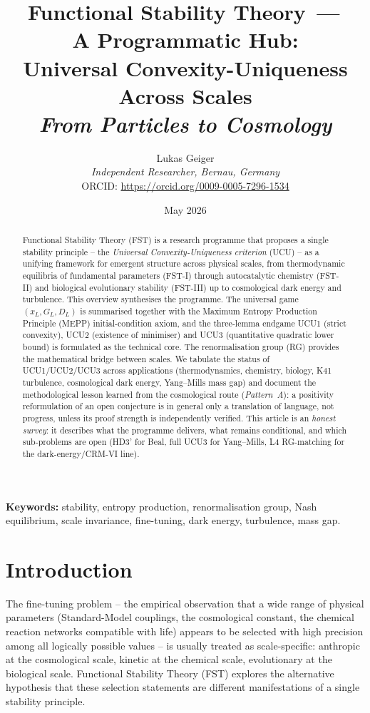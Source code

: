 \documentclass[11pt,a4paper]{article}
\title{Functional Stability Theory \,---\,\\
A Programmatic Hub:\\
Universal Convexity-Uniqueness\\
Across Scales\\[0.5em]
\large\textit{From Particles to Cosmology}}
\author{Lukas Geiger\\
\textit{Independent Researcher, Bernau, Germany}\\
ORCID: \url{https://orcid.org/0009-0005-7296-1534}}
\date{May 2026}
\theoremstyle{remark}
\begin{document}
\maketitle

\begin{abstract}
\noindent
Functional Stability Theory (FST) is a research programme that proposes
a single stability principle -- the \emph{Universal Convexity-Uniqueness
criterion} (UCU) -- as a unifying framework for emergent structure
across physical scales, from thermodynamic equilibria of fundamental
parameters (FST-I) through autocatalytic chemistry (FST-II) and
biological evolutionary stability (FST-III) up to cosmological dark
energy and turbulence. This overview synthesises the programme. The
universal game $(x_L, G_L, D_L)$ is summarised together with the
Maximum Entropy Production Principle (MEPP) initial-condition axiom,
and the three-lemma endgame UCU1 (strict convexity), UCU2 (existence
of minimiser) and UCU3 (quantitative quadratic lower bound) is
formulated as the technical core. The renormalisation group (RG)
provides the mathematical bridge between scales. We tabulate the
status of UCU1/UCU2/UCU3 across applications (thermodynamics,
chemistry, biology, K41 turbulence, cosmological dark energy,
Yang--Mills mass gap) and document the methodological lesson learned
from the cosmological route (\emph{Pattern~A}): a positivity
reformulation of an open conjecture is in general only a translation
of language, not progress, unless its proof strength is independently
verified. This article is an \emph{honest survey}: it describes what
the programme delivers, what remains conditional, and which sub-problems
are open (HD3' for Beal, full UCU3 for Yang--Mills, L4 RG-matching
for the dark-energy/CRM-VI line).
\end{abstract}

\textbf{Keywords:} stability, entropy production, renormalisation group,
Nash equilibrium, scale invariance, fine-tuning, dark energy,
turbulence, mass gap.

\section{Introduction}
\label{sec:intro}

The fine-tuning problem -- the empirical observation that a wide range
of physical parameters (Standard-Model couplings, the cosmological
constant, the chemical reaction networks compatible with life) appears
to be selected with high precision among all logically possible values
-- is usually treated as scale-specific: anthropic at the cosmological
scale, kinetic at the chemical scale, evolutionary at the biological
scale. Functional Stability Theory (FST) explores the alternative
hypothesis that these selection statements are different manifestations
of a single stability principle.
\end{document}
